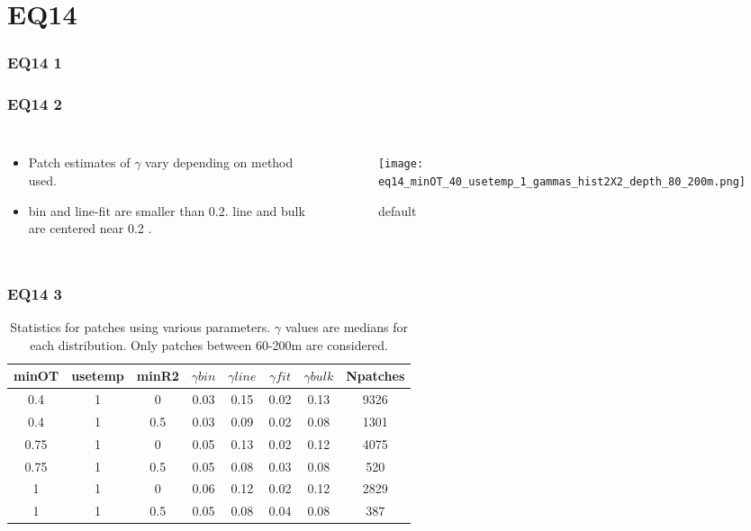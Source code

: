 \documentclass{beamer}
\begin{document}
\section{EQ14}

\begin{frame}
 \frametitle{EQ14 1}


\end{frame}


\begin{frame}
 \frametitle{EQ14 2}


\begin{columns}
\begin{itemize}
\item Patch estimates of $\gamma$ vary depending on method used.
\item bin and line-fit are smaller than 0.2. line and bulk are centered near 0.2 .
\end{itemize}

\begin{figure}[htbp]
\begin{center}
\texttt{[image: eq14\_minOT\_40\_usetemp\_1\_gammas\_hist2X2\_depth\_80\_200m.png]}
\caption{default}
\label{default}
\end{center}
\end{figure}

\end{columns}



\end{frame}



\begin{frame}
 \frametitle{ EQ14 3}

\begin{table}[htdp]
\caption{Statistics for patches using various parameters. $\gamma$ values are medians for each distribution. Only patches between 60-200m are considered.}
\begin{center}
\begin{tabular}{|c|c|c|c|c|c|c|c|}
\hline
minOT & usetemp & minR2 & $\gamma bin$ & $\gamma line$ & $\gamma fit$ & $\gamma bulk$ & Npatches \\
\hline
0.4 & 1 & 0 & 0.03 & 0.15 & 0.02 & 0.13 & 9326 \\
\hline
0.4 & 1 & 0.5 & 0.03 & 0.09 & 0.02 & 0.08 & 1301 \\
\hline
0.75 & 1 & 0 & 0.05 & 0.13 & 0.02 & 0.12 & 4075 \\
\hline
0.75 & 1 & 0.5 & 0.05 & 0.08 & 0.03 & 0.08 & 520 \\
\hline
1 & 1 & 0 & 0.06 & 0.12 & 0.02 & 0.12 & 2829 \\
\hline
1 & 1 & 0.5 & 0.05 & 0.08 & 0.04 & 0.08 & 387 \\
\hline
\hline
\hline
\end{tabular}
\end{center}
\label{tab}
\end{table}%


\end{frame}
\end{document}
